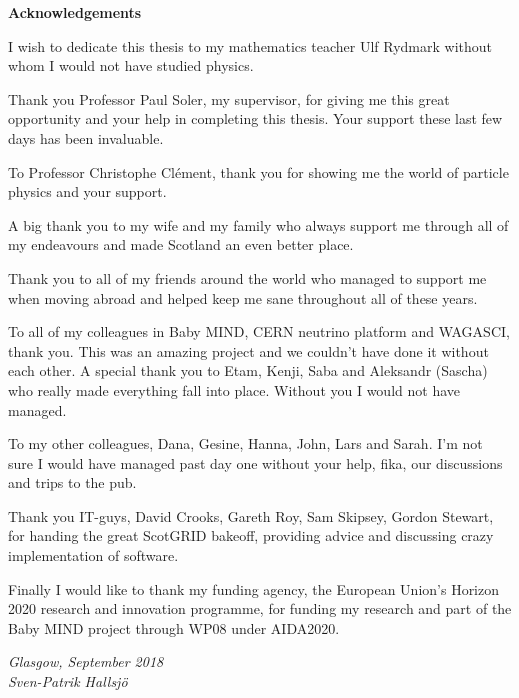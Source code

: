 \vspace*{0.75in}

\begin{center} {\bf Acknowledgements}\end{center}

I wish to dedicate this thesis to my mathematics teacher Ulf Rydmark without whom I would not have studied physics.

Thank you Professor Paul Soler, my supervisor, for giving me this great opportunity and your help in completing this thesis. Your support these last few days has been invaluable.

To Professor Christophe Cl\' {e}ment, thank you for showing me the world of particle physics and your support.

A big thank you to my wife and my family who always support me through all of my endeavours and made Scotland an even better place.

Thank you to all of my friends around the world who managed to support me when moving abroad and helped keep me sane throughout all of these years. 

To all of my colleagues in Baby MIND, CERN neutrino platform and WAGASCI, thank you. This was an amazing project and we couldn't have done it without each other. A special thank you to Etam, Kenji, Saba and Aleksandr (Sascha) who really made everything fall into place. Without you I would not have managed.

To my other colleagues, Dana, Gesine, Hanna, John, Lars and Sarah. I'm not sure I would have managed past day one without your help, fika, our discussions and trips to the pub.

Thank you IT-guys, David Crooks, Gareth Roy, Sam Skipsey, Gordon Stewart, for handing the great ScotGRID bakeoff, providing advice and discussing crazy implementation of software.

Finally I would like to thank my funding agency, the European Union's Horizon 2020 research and innovation programme, for funding my research and part of the Baby MIND project through WP08 under AIDA2020. 

\begin{flushright} \textit{Glasgow, September 2018 \\ Sven-Patrik Hallsj{\"o}}\end{flushright}




